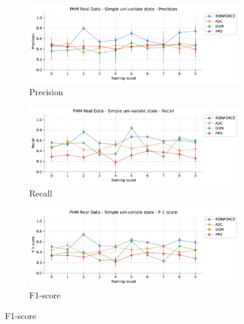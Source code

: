 \documentclass[a4paper, 12pt]{article}
\begin{document}
\begin{figure}[!htbp]
	\begin{subfigure}{\textwidth}
		\centering
		\includegraphics[width=\linewidth]{Singevariable_Pr.pdf}  
		\caption{Precision}
		\label{fig:tr-ss-pr}
	\end{subfigure} \par\smallskip
	
	\begin{subfigure}{\textwidth}
		\centering
		\includegraphics[width=\linewidth]{Singevariable_Rc.pdf}  
		\caption{Recall}
		\label{fig:tr-ss-rc}
	\end{subfigure} \par\smallskip
	
	\begin{subfigure}{\textwidth}
		\centering
		\includegraphics[width=\linewidth]{Singevariable_F1.pdf}  
		\caption{F1-score}
		\label{fig:tr-ss-f1}
	\end{subfigure} \par\smallskip
	

\end{figure}
\end{document}
